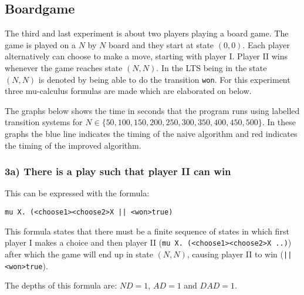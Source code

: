 \documentclass[10pt,a4paper]{article}
\begin{document}


\subsection{Boardgame}
The third and last experiment is about two players playing a board game. The game is played on a $N$ by $N$ board and they start at state $(0, 0)$. Each player alternatively can choose to make a move, starting with player I. Player II wins whenever the game reaches state $(N, N)$. In the LTS being in the state $(N, N)$ is denoted by being able to do the transition {\tt won}. For this experiment three mu-calculus formulas are made which are elaborated on below.

The graphs below shows the time in seconds that the program runs using labelled transition systems for $N \in \{50, 100, 150, 200, 250, 300, 350, 400, 450, 500\}$. In these graphs the blue line indicates the timing of the naive algorithm and red indicates the timing of the improved algorithm.

\subsubsection{3a) There is a play such that player II can win}
This can be expressed with the formula:

\begin{center}
	{\tt mu X. (<choose1><choose2>X || <won>true)}
\end{center}	
	
This formula states that there must be a finite sequence of states in which first player I makes a choice and then player II ({\tt mu X. (<choose1><choose2>X ..)}) after which the game will end up in state $(N, N)$, causing player II to win ({\tt || <won>true}).

The depths of this formula are: $ND = 1$, $AD = 1$ and $DAD = 1$.
\end{document}
